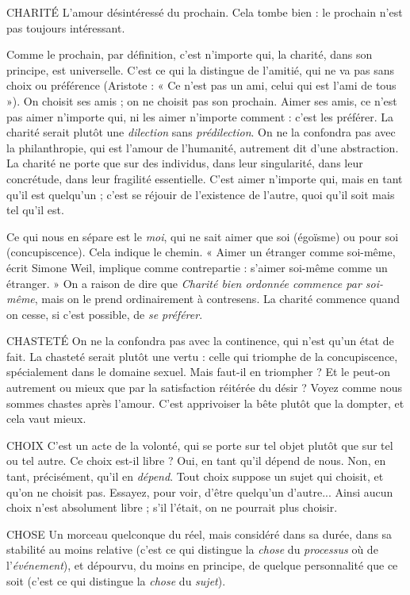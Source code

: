 CHARITÉ L'amour désintéressé du prochain. Cela tombe bien : le prochain
n’est pas toujours intéressant.

Comme le prochain, par définition, c’est n’importe qui, la charité, dans son
principe, est universelle. C’est ce qui la distingue de l’amitié, qui ne va pas sans
choix ou préférence (Aristote : « Ce n’est pas un ami, celui qui est l’ami de
tous »). On choisit ses amis ; on ne choisit pas son prochain. Aimer ses amis, ce
n'est pas aimer n'importe qui, ni les aimer n’importe comment : c’est les préférer.
La charité serait plutôt une {\it dilection} sans {\it prédilection}. On ne la confondra
pas avec la philanthropie, qui est l’amour de l'humanité, autrement dit d’une
abstraction. La charité ne porte que sur des individus, dans leur singularité,
dans leur concrétude, dans leur fragilité essentielle. C’est aimer n’importe qui,
mais en tant qu’il est quelqu'un ; c’est se réjouir de l’existence de l’autre, quoi
qu’il soit mais tel qu’il est.

Ce qui nous en sépare est le {\it moi}, qui ne sait aimer que soi (égoïsme) ou
pour soi (concupiscence). Cela indique le chemin. « Aimer un étranger comme
soi-même, écrit Simone Weil, implique comme contrepartie : s’aimer soi-même
comme un étranger. » On a raison de dire que {\it Charité bien ordonnée
commence par soi-même}, mais on le prend ordinairement à contresens. La charité
commence quand on cesse, si c’est possible, de {\it se préférer}.

CHASTETÉ On ne la confondra pas avec la continence, qui n’est qu’un
état de fait. La chasteté serait plutôt une vertu : celle qui
triomphe de la concupiscence, spécialement dans le domaine sexuel. Mais faut-il
en triompher ? Et le peut-on autrement ou mieux que par la satisfaction réitérée
du désir ? Voyez comme nous sommes chastes après l’amour. C’est apprivoiser
la bête plutôt que la dompter, et cela vaut mieux.

CHOIX C'est un acte de la volonté, qui se porte sur tel objet plutôt que sur
tel ou tel autre. Ce choix est-il libre ? Oui, en tant qu’il dépend de
nous. Non, en tant, précisément, qu’il en {\it dépend}. Tout choix suppose un sujet
qui choisit, et qu’on ne choisit pas. Essayez, pour voir, d’être quelqu'un
d’autre... Ainsi aucun choix n’est absolument libre ; s’il l'était, on ne pourrait
plus choisir.

CHOSE Un morceau quelconque du réel, mais considéré dans sa durée,
dans sa stabilité au moins relative (c’est ce qui distingue la {\it chose} du
{\it processus} où de l'{\it événement}), et dépourvu, du moins en principe, de quelque
personnalité que ce soit (c’est ce qui distingue la {\it chose} du {\it sujet}).

